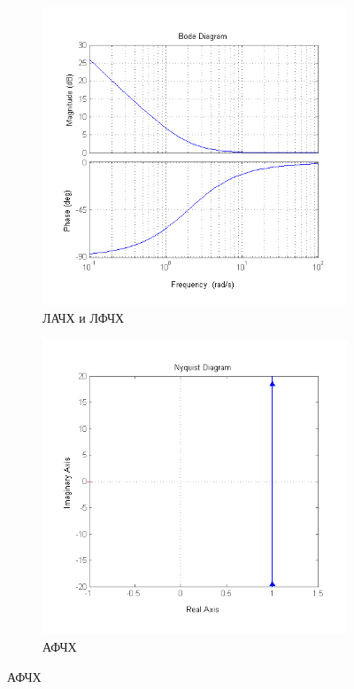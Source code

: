 \documentclass[a4paper, 11pt, russian]{article}
\begin{document}
    \begin{figure}[ht!]
        \centering
        \begin{subfigure}[h]{0.44\textwidth}
            \includegraphics[width = \textwidth]{isodromusLinkBode}
            \caption{ЛАЧХ и ЛФЧХ}
        \end{subfigure}
        \hfill
        \begin{subfigure}[h]{0.44\textwidth}
            \includegraphics[width = \textwidth]{isodromusLinkNyquist}
            \caption{АФЧХ}
        \end{subfigure}
        

\end{figure}
\end{document}
